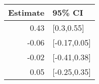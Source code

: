 \begin{tabular}{rl}
  \hline
Estimate & 95\% CI \\ 
  \hline
0.43 & [0.3,0.55] \\ 
  -0.06 & [-0.17,0.05] \\ 
  -0.02 & [-0.41,0.38] \\ 
  0.05 & [-0.25,0.35] \\ 
   \hline
\end{tabular}

